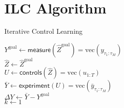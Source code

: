 \documentclass{article}
\begin{document}
\newpage

\section*{ILC Algorithm}

\begin{algorithm}
  \caption{Iterative Control Learning}
  $Y^\text{goal} \gets \textsf{measure}(\hat Z^\text{goal}) = \text{vec}(y_{\tau_1:\tau_M})$\\
  $\hat Z \gets \hat Z^\text{goal}$\\
  $U \gets \textsf{controls}(\hat Z) = \text{vec}(u_{1:T})$ \\
  $\bar Y \gets \textsf{experiment}(U) = \text{vec}(\bar y_{\tau_1:\tau_M})$\\
  $\Delta Y \gets \bar Y - Y^\text{goal}$ \\
  $k \gets 1$\\
\end{algorithm}


 
\end{document}
